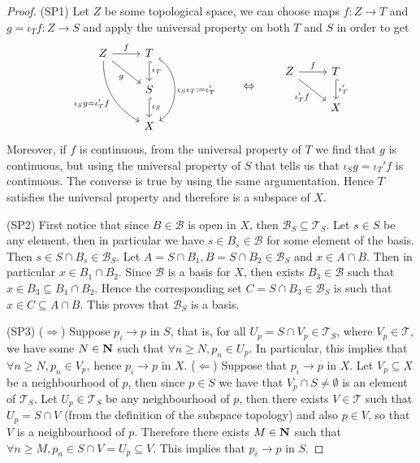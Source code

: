 \begin{proof}
  (SP1) Let \(Z\) be some topological space, we can choose maps \(f: Z \to T\)
  and \(g = \iota_T  f : Z \to S\) and apply the universal property on both
  \(T\) and \(S\) in order to get
  \[
    \begin{tikzcd}
      Z \ar[r,"f"]
      \ar[rd, swap, "g"]
      \ar[rdd, swap, bend right,
      "\iota_S  g = \iota_T'  f"]
        &T \ar[d, hook, "\iota_T"]
        \ar[dd, hook, bend left = 60, "\iota_S  \iota_T := \iota_T'"]\\
        &S \ar[d, hook, "\iota_S"] \\
        &X
    \end{tikzcd}
    \qquad \Leftrightarrow \qquad
    \begin{tikzcd}
      Z \ar[dr, swap, "\iota_T'  f"] \ar[r, "f"]
        &T \ar[d, hook, "\iota_T'"] \\
        &X
    \end{tikzcd}
  \]
  Moreover, if \(f\) is continuous, from the universal property of \(T\) we find
  that \(g\) is continuous, but using the universal property of \(S\) that tells
  us that \(\iota_S  g = \iota_T'  f\) is continuous. The converse is
  true by using the same argumentation. Hence \(T\) satisfies the universal
  property and therefore is a subspace of \(X\).

  (SP2) First notice that since \(B \in \mathcal B\) is open in \(X\), then
  \(\mathcal B_S \subseteq \mathcal T_S\). Let \(s \in S\) be any element, then
  in particular we have \(s \in B_s \in \mathcal B\) for some element of the
  basis. Then \(s \in S \cap B_s \in \mathcal B_S\). Let \(A = S \cap B_1, B = S
  \cap B_2 \in \mathcal B_S\) and \(x \in A \cap B\). Then in particular \(x \in
  B_1 \cap B_2\). Since \(\mathcal B\) is a basis for \(X\), then exists \(B_3
  \in \mathcal B\) such that \(x \in B_3 \subseteq B_1 \cap B_2\). Hence the
  corresponding set \(C = S \cap B_3 \in \mathcal B_S\) is such that \(x \in C
  \subseteq A \cap B\). This proves that \(\mathcal B_S\) is a basis.

  (SP3) (\(\Rightarrow\)) Suppose \(p_i \to p\) in \(S\), that is, for all \(U_p
  = S \cap V_p \in \mathcal T_S\), where \(V_p \in \mathcal T\), we have some
  \(N \in \mathbf{N}\) such that \(\forall n \geq N, p_n \in U_p\). In
  particular, this implies that \(\forall n \geq N, p_n \in V_p\), hence \(p_i
  \to p\) in \(X\).
  (\(\Leftarrow\)) Suppose that \(p_i \to p\) in \(X\). Let \(V_p \subseteq X\)
  be a neighbourhood of \(p\), then since \(p \in S\) we have that \(V_p \cap S
  \neq \emptyset\) is an element of \(\mathcal T_S\). Let \(U_p \in
  \mathcal T_S\) be any neighbourhood of \(p\), then there exists \(V \in
  \mathcal T\) such that \(U_p = S \cap V\) (from the definition of the subspace
  topology) and also \(p \in V\), so that \(V\) is a neighbourhood of \(p\).
  Therefore there exists \(M \in \mathbf{N}\) such that \(\forall n \geq M, p_n
  \in S \cap V = U_p \subseteq V\). This implies that \(p_i \to p\) in \(S\).


\end{proof}

